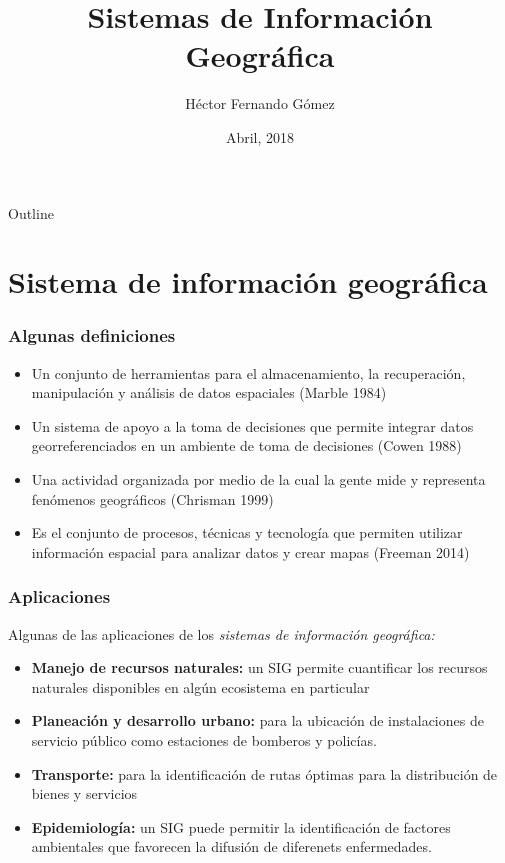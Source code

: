 \documentclass{beamer}
\title{Sistemas de Información Geográfica}
\author{Héctor Fernando Gómez}
\institute{Universidad del Caribe\\ \tiny Cancún, México}
\date{Abril, 2018}
\begin{document}

\begin{frame}
\titlepage
\end{frame}

\begin{frame}{Outline}
\tableofcontents
\end{frame}


\section{Sistema de información geográfica} 

\begin{frame}
	\frametitle{Algunas definiciones}		
	
	\begin{itemize}
		\item{Un conjunto de herramientas para el almacenamiento, la
recuperación, manipulación y análisis de datos espaciales (Marble 1984)}
		\item{Un sistema de apoyo a la toma de decisiones que permite
integrar datos georreferenciados en un ambiente de toma
de decisiones (Cowen 1988)}
		\item{Una actividad organizada por medio de la cual la gente
mide y representa fenómenos geográficos (Chrisman 1999)}
		\item{Es el conjunto de procesos, técnicas y tecnología que
permiten utilizar información espacial para analizar datos y
crear mapas (Freeman 2014)}
	\end{itemize}	
\end{frame}

\begin{frame}
	\frametitle{Aplicaciones}

	Algunas de las aplicaciones de los \textit{sistemas de información geográfica:}
	
	\begin{itemize}
		\item{\textbf{Manejo de recursos naturales:} un SIG permite cuantificar los recursos naturales disponibles en algún ecosistema en particular}
		\item{\textbf{Planeación y desarrollo urbano:} para la ubicación de instalaciones de servicio público como estaciones de bomberos y policías.}
		\item{\textbf{Transporte: } para la identificación de rutas óptimas para la distribución de bienes y servicios}
		\item{\textbf{Epidemiología:} un SIG puede permitir la identificación de factores ambientales que favorecen la difusión de diferenets enfermedades.}
	\end{itemize}
\end{frame}
\end{document}
